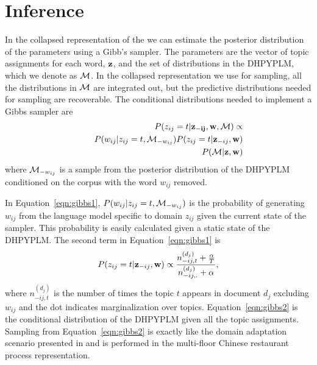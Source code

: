 \section{Inference}

In the collapsed representation of  the \ourmodel we can estimate the posterior distribution of the parameters using a Gibb's sampler.  The parameters are the vector of topic assignments for each word, ${\bf z}$,  and the set of distributions in the DHPYPLM, which we denote as $\M$.  In the collapsed representation we use for sampling, all the distributions in $\M$ are integrated out, but the predictive distributions needed for sampling are recoverable. The conditional distributions needed to implement a Gibbs sampler are
%
\begin{eqnarray}
& &P(z_{ij} = t | \mathbf{z_{-ij}},\mathbf{w}, \M) \propto  \label{eqn:gibbs1}\\
& &	\hspace{.5cm} P(w_{ij}|z_{ij}=t, \M_{-w_{ij}})P(z_{ij} = t | \mathbf{z}_{-ij}, {\bf w}) \nonumber \\
& &P(\M |  {\bf z} , {\bf w}) \label{eqn:gibbs2} 
\end{eqnarray}
%
\noindent where $\M_{-w_{ij}}$ is a sample from the posterior distribution of the DHPYPLM conditioned on the corpus with the word $w_{ij}$ removed. 

In Equation~\ref{eqn:gibbs1}, $P(w_{ij}|z_{ij}=t, \M_{-w_{ij}})$ is the probability of generating $w_{ij}$ from the language model specific to domain $z_{ij}$ given the current state of the sampler.  This probability is easily calculated given a static state of the DHPYPLM.  The second term in Equation~\ref{eqn:gibbs1} is
%
\begin{eqnarray*}
P(z_{ij} = t | \mathbf{z}_{-ij}, {\bf w}) \propto \frac{n^{(d_j)}_{-ij,t} + \frac{\alpha}{T}}{n^{(d_j)}_{-ij,.} + \alpha},
\end{eqnarray*}
%
\noindent where $n^{(d_j)}_{-ij,t}$ is the number of times the topic $t$ appears in document $d_j$ excluding $w_{ij}$ and the dot indicates marginalization over topics. Equation~\ref{eqn:gibbs2} is the conditional distribution of the DHPYPLM given all the topic assignments.  Sampling from Equation~\ref{eqn:gibbs2} is exactly like the domain adaptation scenario presented in \cite{Wood2009a} and is performed in the multi-floor Chinese restaurant process representation.

